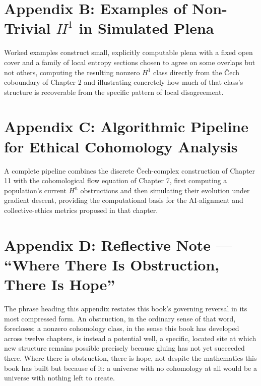 \chapter*{Appendix B: Examples of Non-Trivial $H^1$ in Simulated Plena}

Worked examples construct small, explicitly computable plena with a fixed open cover and a family of local entropy sections chosen to agree on some overlaps but not others, computing the resulting nonzero $H^1$ class directly from the Čech coboundary of Chapter 2 and illustrating concretely how much of that class's structure is recoverable from the specific pattern of local disagreement.

\chapter*{Appendix C: Algorithmic Pipeline for Ethical Cohomology Analysis}

A complete pipeline combines the discrete Čech-complex construction of Chapter 11 with the cohomological flow equation of Chapter 7, first computing a population's current $H^n$ obstructions and then simulating their evolution under gradient descent, providing the computational basis for the AI-alignment and collective-ethics metrics proposed in that chapter.

\chapter*{Appendix D: Reflective Note --- ``Where There Is Obstruction, There Is Hope''}

The phrase heading this appendix restates this book's governing reversal in its most compressed form. An obstruction, in the ordinary sense of that word, forecloses; a nonzero cohomology class, in the sense this book has developed across twelve chapters, is instead a potential well, a specific, located site at which new structure remains possible precisely because gluing has not yet succeeded there. Where there is obstruction, there is hope, not despite the mathematics this book has built but because of it: a universe with no cohomology at all would be a universe with nothing left to create.
